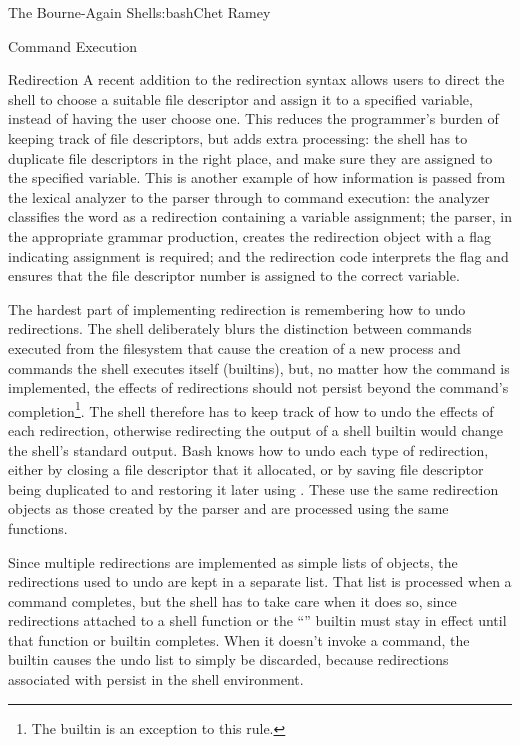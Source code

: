 \begin{aosachapter}{The Bourne-Again Shell}{s:bash}{Chet Ramey}
\begin{aosasect1}{Command Execution}
\begin{aosasect2}{Redirection}
A recent addition to the redirection syntax allows users to direct the
shell to choose a suitable file descriptor and assign it to a
specified variable, instead of having the user choose one.  This
reduces the programmer's burden of keeping track of file descriptors,
but adds extra processing: the shell has to duplicate file descriptors
in the right place, and make sure they are assigned to the specified
variable.  This is another example of how information is passed from
the lexical analyzer to the parser through to command execution: the
analyzer classifies the word as a redirection containing a variable
assignment; the parser, in the appropriate grammar production, creates
the redirection object with a flag indicating assignment is required;
and the redirection code interprets the flag and ensures that the file
descriptor number is assigned to the correct variable.

The hardest part of implementing redirection is remembering how to
undo redirections.  The shell deliberately blurs the distinction
between commands executed from the filesystem that cause the creation
of a new process and commands the shell executes itself (builtins),
but, no matter how the command is implemented, the effects of
redirections should not persist beyond the command's completion\footnote{The
 builtin is an exception to this rule.}. The shell therefore has
to keep track of how to undo the effects of each redirection,
otherwise redirecting the output of a shell builtin would change the
shell's standard output.  Bash knows how to undo each type of
redirection, either by closing a file descriptor that it allocated, or
by saving file descriptor being duplicated to and restoring it later
using .  These use the same redirection objects as those
created by the parser and are processed using the same functions.

Since multiple redirections are implemented as simple lists of
objects, the redirections used to undo are kept in a separate list.
That list is processed when a command completes, but the shell has to
take care when it does so, since redirections attached to a shell
function or the ``'' builtin must stay in effect until that
function or builtin completes.  When it doesn't invoke a command, the
 builtin causes the undo list to simply be discarded,
because redirections associated with  persist in the shell
environment.


\end{aosasect2}
\end{aosasect1}
\end{aosachapter}
